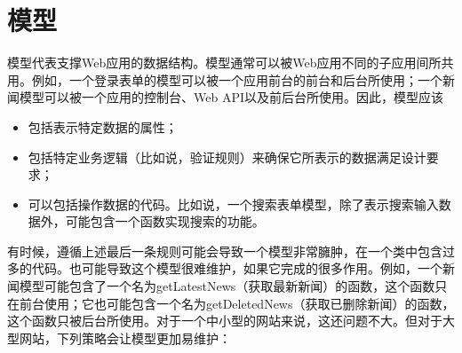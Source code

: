 \section{模型}


模型代表支撑Web应用的数据结构。模型通常可以被Web应用不同的子应用间所共用。例如，一个登录表单的模型可以被一个应用前台的前台和后台所使用；一个新闻模型可以被一个应用的控制台、Web API以及前后台所使用。因此，模型应该

\begin{itemize}
\item 包括表示特定数据的属性；
\item 包括特定业务逻辑（比如说，验证规则）来确保它所表示的数据满足设计要求；
\item 可以包括操作数据的代码。比如说，一个搜索表单模型，除了表示搜索输入数据外，可能包含一个函数实现搜索的功能。
\end{itemize}


有时候，遵循上述最后一条规则可能会导致一个模型非常臃肿，在一个类中包含过多的代码。也可能导致这个模型很难维护，如果它完成的很多作用。例如，一个新闻模型可能包含了一个名为getLatestNews（获取最新新闻）的函数，这个函数只在前台使用；它也可能包含一个名为getDeletedNews（获取已删除新闻）的函数，这个函数只被后台所使用。对于一个中小型的网站来说，这还问题不大。但对于大型网站，下列策略会让模型更加易维护：

